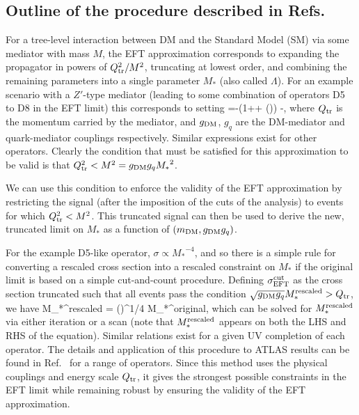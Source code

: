 \subsection*{Outline of the procedure described in Refs.~\cite{Busoni:2014sya,Aad:2015zva}}

For a tree-level interaction between DM and the Standard Model (SM) via some mediator with mass $M$, the EFT approximation corresponds to expanding the propagator 
in powers of $Q_{\rm tr}^2/M^2$, truncating at lowest order, and combining the remaining parameters into a single parameter ${M_*}$ (also called $\Lambda$). For an example scenario with a $Z'$-type mediator (leading to some combination of operators D5 to D8 in the EFT limit)
this corresponds to setting
%
\be
{}=-\left(1++  \left(\right)\right) \simeq -,
\ee
%
where $Q_{\rm tr}$ is the momentum carried by the mediator, and $g_{\rm DM}$, $g_q$ are the DM-mediator and quark-mediator couplings respectively. Similar expressions exist for other operators. Clearly the condition that must be satisfied for this approximation to be valid is that $Q_{\rm tr}^2 < M^2 = g_{\rm DM} g_q {M_*}^2$. 

We can use this condition to enforce the validity of the EFT approximation by restricting the signal (after the imposition of the cuts of the analysis) to events for which $Q_{\rm tr}^2 < M^2$. This truncated signal can then be used to derive the new, truncated limit on $M_*$ as a function of $(m_{\rm DM}, g_{\rm DM} g_q)$.

For the example D5-like operator, $\sigma \propto {M_*}^{-4}$, and so there is a simple rule for converting a rescaled cross section into a rescaled constraint on ${M_*}$ if the original limit is based on a simple cut-and-count procedure. Defining $\sigma_{\rm EFT}^{\rm cut}$ as the cross section truncated such that all events pass the condition $\sqrt{g_{\rm DM} g_q} M_*^{\rm rescaled} > Q_{\rm tr}$, we have
%
\be
M_*^{\rm rescaled} = \left(\right)^{1/4} M_*^{\rm original},
\ee
%
which can be solved for $M_*^{\rm rescaled}$ via either iteration or a scan (note that $M_*^{\rm rescaled}$ appears on both the LHS and RHS of the equation). Similar relations exist for a given UV completion of each operator. The details and application of this procedure to ATLAS results can be found in Ref.~\cite{Aad:2015zva} for a range of operators. Since this method uses the physical couplings and energy scale $Q_{\rm tr}$, it gives the strongest possible constraints in the EFT limit while remaining robust by ensuring the validity of the EFT approximation. 

